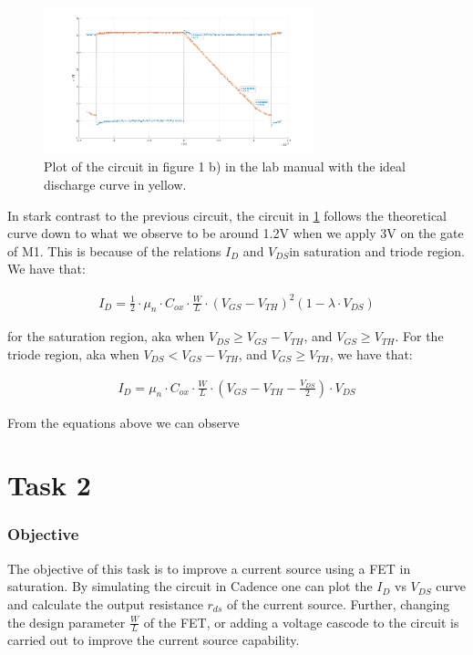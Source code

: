 \documentclass[onecolumn]{article}
\begin{document}
\begin{figure}[h!]
    \centering
    \includegraphics[width=0.7\textwidth]{1b.jpg}
    \caption{Plot of the circuit in figure 1 b) in the lab manual with the ideal discharge curve in yellow.}
    \label{fig:task1b}
\end{figure}

In stark contrast to the previous circuit, the circuit in \ref{fig:task1b} follows the theoretical curve down to what we observe to be around 1.2V when we apply 3V on the gate of M1. This is because of the relations $I_D$ and $V_{DS}$in saturation and triode region. We have that:

\begin{align}
    I_D = \frac{1}{2} \cdot \mu_n \cdot C_{ox} \cdot \frac{W}{L} \cdot (V_{GS} - V_{TH})^2(1 - \lambda \cdot V_{DS})
\end{align}

for the saturation region, aka when $V_{DS} \geq V_{GS} - V_{TH}$, and $V_{GS} \geq V_{TH}$. For the triode region, aka when $V_{DS} \lt V_{GS} - V_{TH}$, and $V_{GS} \geq V_{TH}$, we have that:

\begin{align}
    I_D = \mu_n \cdot C_{ox} \cdot \frac{W}{L} \cdot (V_{GS} - V_{TH} - \frac{V_{DS}}{2}) \cdot V_{DS}
\end{align}

From the equations above we can observe 

\section{Task 2}

\subsubsection*{Objective}
The objective of this task is to improve a current source using a FET in saturation. By simulating the circuit in Cadence one can plot the $I_D$ vs $V_{DS}$ curve and calculate the output resistance $r_{ds}$ of the current source. Further, changing the design parameter $\frac{W}{L}$ of the FET, or adding a voltage cascode to the circuit is carried out to improve the current source capability.
\end{document}
